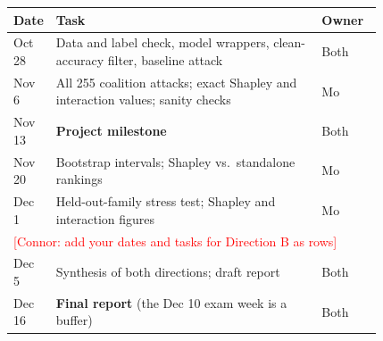 \documentclass{article}
\newcommand{\connor}[1]{\textcolor{red}{[Connor: #1]}}
\begin{document}
\begin{center}
  \small
  \begin{tabular}{p{0.1\linewidth}p{0.72\linewidth}l}
    \toprule
    Date & Task & Owner \\
    \midrule
    Oct 28 & Data and label check, model wrappers, clean-accuracy filter, baseline attack & Both \\
    Nov 6  & All 255 coalition attacks; exact Shapley and interaction values; sanity checks & Mo \\
    Nov 13 & \textbf{Project milestone} & Both \\
    Nov 20 & Bootstrap intervals; Shapley vs.\ standalone rankings & Mo \\
    Dec 1  & Held-out-family stress test; Shapley and interaction figures & Mo \\
    \multicolumn{3}{l}{\connor{add your dates and tasks for Direction B as rows}} \\
    Dec 5  & Synthesis of both directions; draft report & Both \\
    Dec 16 & \textbf{Final report} (the Dec 10 exam week is a buffer) & Both \\
    \bottomrule
  \end{tabular}
\end{center}



\end{document}

